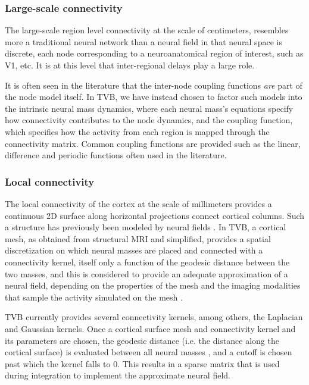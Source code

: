 	\subsubsection{Large-scale connectivity}

	The large-scale region level connectivity at the scale of centimeters,
	resembles more a traditional
	neural network than a neural field in that neural space is discrete, 
	each node corresponding to a neuroanatomical region of interest, such
	as V1, etc. It is at this level that inter-regional delays play a large
	role. 

	It is often seen in the literature that the inter-node coupling functions
	\textit{are} part of the node model itself. In TVB, we have instead 
	chosen to factor such models into the intrinsic neural mass dynamics, where each 
	neural mass's equations specify how connectivity contributes to the
	node dynamics, and the coupling function, which specifies how the activity
	from each region is mapped through the connectivity matrix. Common coupling 
	functions are provided such as the linear, difference and periodic functions
	often used in the literature.

	\subsubsection{Local connectivity}

	The local connectivity of the cortex at the scale of millimeters provides
	a continuous 2D surface along horizontal projections connect 
	cortical columns. Such a structure has previously been modeled by
	neural fields \cite{Amari_1977,Jirsa_1997}. In TVB, a cortical mesh, 
	as obtained from structural MRI and simplified, provides a spatial 
	discretization on which neural masses are placed and connected with a
	connectivity kernel, itself only a function of the geodesic distance
	between the two masses, and this is considered to provide an
	adequate approximation of a neural field, depending on the properties
	of the mesh and the imaging modalities that sample the activity simulated
	on the mesh \cite{Spiegler_2013}. 

	TVB currently provides several connectivity kernels, among others, 
	the Laplacian and Gaussian kernels. Once a cortical surface mesh 
	and connectivity kernel and its parameters are chosen, the geodesic
	distance (i.e. the distance along the cortical surface) is evaluated
	between all neural masses \cite{Mitchell1987}, and a cutoff is chosen
	past which the kernel falls to 0. This results in a sparse matrix that 
	is used during integration to implement the approximate neural field. 

